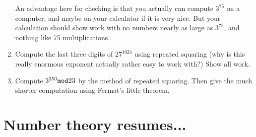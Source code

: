 \documentclass[12pt]{article}
\begin{document}
\begin{enumerate}
An advantage here for checking is that you actually can compute $3^{75}$ on a computer, and maybe on your calculator if it is very nice.  But your calculation should show work with no numbers nearly as large as $3^{75}$, and nothing like 75 multiplications.

\item Compute the last three digits of $27^{1024}$ using repeated squaring (why is this really enormous exponent actually rather easy to work with?)  Show all work.

\item Compute $3^{250} {\tt mod} 23$ by the method of repeated squaring.  Then give the much shorter computation using Fermat's little theorem.


\end{enumerate}

\section{Number theory resumes...}
\end{document}
